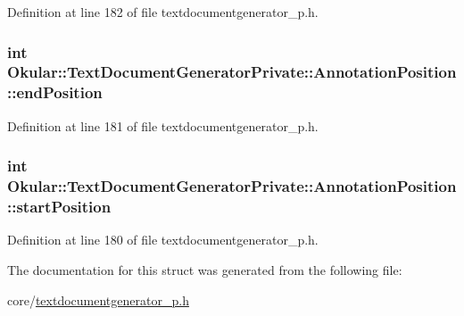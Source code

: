 Definition at line 182 of file textdocumentgenerator\+\_\+p.\+h.

\hypertarget{structOkular_1_1TextDocumentGeneratorPrivate_1_1AnnotationPosition_a772c24061b1b2f5101440b31d2e8e871}{
\subsubsection[{end\+Position}]{\setlength{\rightskip}{0pt plus 5cm}int Okular\+::\+Text\+Document\+Generator\+Private\+::\+Annotation\+Position\+::end\+Position}}\label{structOkular_1_1TextDocumentGeneratorPrivate_1_1AnnotationPosition_a772c24061b1b2f5101440b31d2e8e871}


Definition at line 181 of file textdocumentgenerator\+\_\+p.\+h.

\hypertarget{structOkular_1_1TextDocumentGeneratorPrivate_1_1AnnotationPosition_aa8fd3b91acb6195b9341ac9838c28402}{
\subsubsection[{start\+Position}]{\setlength{\rightskip}{0pt plus 5cm}int Okular\+::\+Text\+Document\+Generator\+Private\+::\+Annotation\+Position\+::start\+Position}}\label{structOkular_1_1TextDocumentGeneratorPrivate_1_1AnnotationPosition_aa8fd3b91acb6195b9341ac9838c28402}


Definition at line 180 of file textdocumentgenerator\+\_\+p.\+h.



The documentation for this struct was generated from the following file\+:\begin{DoxyCompactItemize}
\item 
core/\hyperlink{textdocumentgenerator__p_8h}{textdocumentgenerator\+\_\+p.\+h}\end{DoxyCompactItemize}
